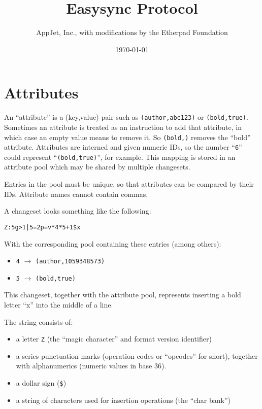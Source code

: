 \documentclass[12pt]{article}
\begin{document}
\title{Easysync Protocol}
\author{AppJet, Inc., with modifications by the Etherpad Foundation}
\date{\today}

\maketitle

\section{Attributes}

An ``attribute'' is a (key,value) pair such as
\verb|(author,abc123)| or \verb|(bold,true)|.
Sometimes an attribute is treated as an instruction to add
that attribute, in which case an empty value means to
remove it.  So \verb|(bold,)| removes the ``bold''
attribute.  Attributes are interned and given numeric IDs,
so the number ``\verb|6|'' could represent
``\verb|(bold,true)|'', for example.  This mapping is
stored in an attribute pool which may be shared by
multiple changesets.

Entries in the pool must be unique, so that attributes can
be compared by their IDs.  Attribute names cannot contain
commas.

A changeset looks something like the following:

\begin{verbatim}
Z:5g>1|5=2p=v*4*5+1$x
\end{verbatim}

With the corresponding pool containing these entries (among others):

\begin{itemize}
\item[] \verb|4| $\rightarrow$ \verb|(author,1059348573)|
\item[] \verb|5| $\rightarrow$ \verb|(bold,true)|
\end{itemize}

This changeset, together with the attribute pool,
represents inserting a bold letter ``x'' into the middle
of a line.

The string consists of:

\begin{itemize}
\item a letter \verb|Z| (the ``magic character'' and
  format version identifier)
\item a series punctuation marks (operation codes or
  ``opcodes'' for short), together with alphanumerics
  (numeric values in base 36).
\item a dollar sign (\verb|$|)
\item a string of characters used for insertion operations
  (the ``char bank'')
\end{itemize}
\end{document}
